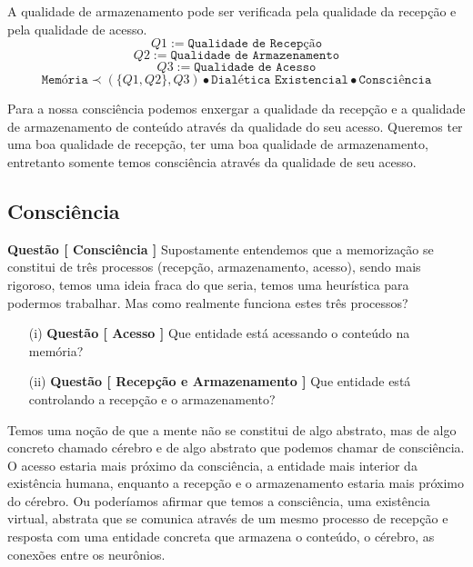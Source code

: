 A qualidade de armazenamento pode ser verificada pela qualidade da recepção e pela qualidade de acesso.\\

$$ Q1:= \texttt{Qualidade de Recepção} $$
$$ Q2:= \texttt{Qualidade de Armazenamento} $$
$$ Q3:= \texttt{Qualidade de Acesso} $$
$$  \texttt{Memória} \prec (\{Q1,Q2\} , Q3) \bullet \texttt{Dialética Existencial} \bullet \texttt{Consciência} $$
\hrulefill

Para a nossa consciência podemos enxergar a qualidade da recepção e a qualidade de armazenamento de conteúdo através da qualidade do seu acesso. Queremos ter uma boa qualidade de recepção, ter uma boa qualidade de armazenamento, entretanto somente temos consciência através da qualidade de seu acesso. 

% 

\hspace{\baselineskip}

\subsection{Consciência}

\hspace{\baselineskip}

\textbf{Questão [ Consciência ]} Supostamente entendemos que a memorização se constitui de três processos (recepção, armazenamento, acesso), sendo mais rigoroso, temos uma ideia fraca do que seria, temos uma heurística para podermos trabalhar. Mas como realmente funciona estes três processos?

\begin{itemize}
	\item[ (i) ] \textbf{Questão [ Acesso ]} Que entidade está acessando o conteúdo na memória?
	\item[ (ii) ] \textbf{Questão [ Recepção e Armazenamento ]} Que entidade está controlando a recepção e o armazenamento?
\end{itemize}

Temos uma noção de que a mente não se constitui de algo abstrato, mas de algo concreto chamado cérebro e de algo abstrato que podemos chamar de consciência. O acesso estaria mais próximo da consciência, a entidade mais interior da existência humana, enquanto a recepção e o armazenamento estaria mais próximo do cérebro. Ou poderíamos afirmar que temos a consciência, uma existência virtual, abstrata que se comunica através de um mesmo processo de recepção e resposta com uma entidade concreta que armazena o conteúdo, o cérebro, as conexões entre os neurônios.

